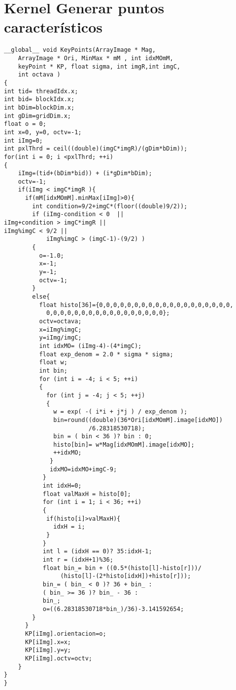 \chapter{Kernel Generar puntos característicos}
\begin{small}

\begin{lstlisting}
__global__ void KeyPoints(ArrayImage * Mag,
	ArrayImage * Ori, MinMax * mM , int idxMOmM,
	keyPoint * KP, float sigma, int imgR,int imgC,
	int octava )
{
int tid= threadIdx.x;
int bid= blockIdx.x;
int bDim=blockDim.x;
int gDim=gridDim.x;
float o = 0;
int x=0, y=0, octv=-1;
int iImg=0;
int pxlThrd = ceil((double)(imgC*imgR)/(gDim*bDim)); 
for(int i = 0; i <pxlThrd; ++i) 
{
	iImg=(tid+(bDim*bid)) + (i*gDim*bDim);  
	octv=-1;
	if(iImg < imgC*imgR ){
	  if(mM[idxMOmM].minMax[iImg]>0){
		int condition=9/2+imgC*(floor((double)9/2));
		if (iImg-condition < 0  ||														iImg+condition > imgC*imgR ||												iImg%imgC < 9/2 ||										
			iImg%imgC > (imgC-1)-(9/2) )							
		{                  
		  o=-1.0;
		  x=-1;
		  y=-1;
		  octv=-1;
		}
		else{
		  float histo[36]={0,0,0,0,0,0,0,0,0,0,0,0,0,0,0,0,0,0,0,
		  	0,0,0,0,0,0,0,0,0,0,0,0,0,0,0,0,0};
		  octv=octava;
		  x=iImg%imgC;
		  y=iImg/imgC;
		  int idxMO= (iImg-4)-(4*imgC);
		  float exp_denom = 2.0 * sigma * sigma;
		  float w;
		  int bin;
		  for (int i = -4; i < 5; ++i)
		  {
		    for (int j = -4; j < 5; ++j)
			{
			  w = exp( -( i*i + j*j ) / exp_denom );
			  bin=round((double)(36*Ori[idxMOmM].image[idxMO])
			  			/6.28318530718);
	  		  bin = ( bin < 36 )? bin : 0;
	  		  histo[bin]= w*Mag[idxMOmM].image[idxMO];
	  		  ++idxMO;
			 }
			 idxMO=idxMO+imgC-9;
		   }
		   int idxH=0;
		   float valMaxH = histo[0];
		   for (int i = 1; i < 36; ++i)
		   {
		    if(histo[i]>valMaxH){
		      idxH = i;
		    }
		   }
		   int l = (idxH == 0)? 35:idxH-1;
		   int r = (idxH+1)%36;
		   float bin_= bin + ((0.5*(histo[l]-histo[r]))/
		   		(histo[l]-(2*histo[idxH])+histo[r]));
		   bin_= ( bin_ < 0 )? 36 + bin_ :
		   ( bin_ >= 36 )? bin_ - 36 :
		   bin_;
		   o=((6.28318530718*bin_)/36)-3.141592654;
	    }
	  }
	  KP[iImg].orientacion=o;
	  KP[iImg].x=x;
	  KP[iImg].y=y;
	  KP[iImg].octv=octv;
	}
}
}
\end{lstlisting}

\end{small}
\pagebreak

